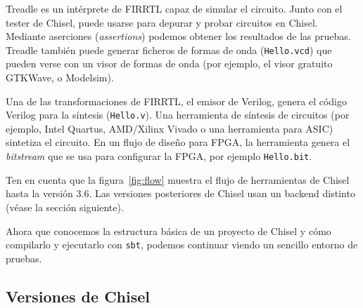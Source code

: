 \documentclass[%
    10pt,
    headinclude, footinclude=false,
    openright, %
    notitlepage,
    cleardoublepage=empty,
    headsepline,
    numbers=noenddot,
    bibliography=totoc, index=totoc,
    ]{scrbook}
\newcommand{\code}[1]{{\lstinline[basicstyle=\small\ttfamily]{#1}}}
\begin{document}

Treadle es un intérprete de FIRRTL capaz de simular el circuito. Junto con el tester de Chisel, puede
usarse para depurar y probar circuitos en Chisel. Mediante aserciones (\emph{assertions}) podemos obtener 
los resultados de las pruebas.
Treadle también puede generar ficheros de formas de onda (\code{Hello.vcd}) que pueden verse con
un visor de formas de onda (por ejemplo, el visor gratuito GTKWave, o Modelsim).


Una de las transformaciones de FIRRTL, el emisor de Verilog, genera el código Verilog para la síntesis
(\code{Hello.v}).
Una herramienta de síntesis de circuitos (por ejemplo, Intel Quartus, AMD/Xilinx Vivado o una herramienta
para ASIC) sintetiza el circuito.
En un flujo de diseño para FPGA, la herramienta genera el \emph{bitstream} que se usa para configurar la
FPGA, por ejemplo \code{Hello.bit}.


Ten en cuenta que la figura~\ref{fig:flow} muestra el flujo de herramientas de Chisel hasta la versión 3.6.
Las versiones posteriores de Chisel usan un backend distinto (véase la sección siguiente).


Ahora que conocemos la estructura básica de un proyecto de Chisel y cómo compilarlo y ejecutarlo
con \code{sbt}, podemos continuar viendo un sencillo entorno de pruebas.

\subsection{Versiones de Chisel}
\end{document}
